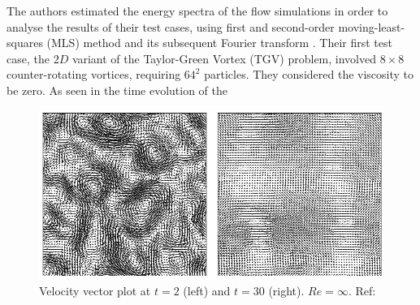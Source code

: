 The authors estimated the energy spectra of the flow simulations in order to analyse the results of their test cases, using first and second-order moving-least-squares (MLS) method \parencite{gossler2001moving} and its subsequent Fourier transform \parencite{frigo2005design}.
Their first test case, the $2D$ variant of the Taylor-Green Vortex (TGV) problem, involved $8\times 8$ counter-rotating vortices, requiring $64^2$ particles. They considered the viscosity to be zero.
As seen in the time evolution of the 
\begin{figure}[h!]
	\centering
	\includegraphics[scale=0.7]{Figures/research_papers/adami2012-evolution-vel-field-tgv.png}
	\caption{Velocity vector plot at $t=2$ (left) and $t=30$ (right). $Re = \infty$. Ref: \parencite{Adami2012} }
	\label{fig:adami2012-evolution-vel-field-tgv}
\end{figure}

